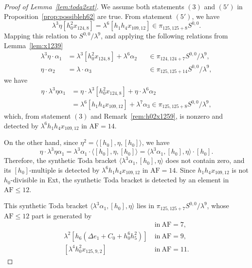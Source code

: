 \documentclass{amsart}
\numberwithin{equation}{section}
\newcommand{\AF}{\mathrm{AF}}
\begin{document}
\begin{proof}[Proof of Lemma~\ref{lem:toda2ext}]
    We assume both statements $(3)$ and $(5')$ in Proposition~\ref{prop:possibleh62} are true. From statement $(5')$, we have 
    $$\lambda^3 \eta [h_0^2x_{124,8}] = \lambda^6 [h_1h_4x_{109,12}] \in \pi_{125,125+8} S^{0,0}.$$
Mapping this relation to $S^{0,0}/\lambda^9$, and applying the following relations from Lemma~\ref{lem:x1239}
\begin{align*}
        \lambda^3 \eta \cdot \alpha_1 & = \lambda^3 [h_0^2 x_{124,8}] + 
\lambda^6 \alpha_2 && \in \pi_{124,124+7} S^{0,0}/\lambda^9,\\
\eta \cdot \alpha_2 & = \lambda \cdot \alpha_3 && \in \pi_{125,125+14} S^{0,0}/\lambda^9,
    \end{align*}
we have
\begin{align*}
    \eta \cdot \lambda^3 \eta \alpha_1 & = \eta \cdot \lambda^3 [h_0^2 x_{124,8}] + \eta \cdot \lambda^6 \alpha_2\\
   & = \lambda^6 [h_1h_4x_{109,12}] + \lambda^7 \alpha_3 \in \pi_{125,125+8} S^{0,0}/\lambda^9,
 \end{align*}
 which, from statement $(3)$ and Remark~\ref{rem:h02x1259}, is nonzero and detected by $\lambda^6 h_1h_4x_{109,12}$ in $\AF=14$.
 
 On the other hand, since $\eta^2 = \langle [h_0], \eta, [h_0] \rangle$, we have
 $$\eta \cdot \lambda^3 \eta \alpha_1 = \lambda^3 \alpha_1 \cdot \langle [h_0], \eta, [h_0] \rangle = \langle \lambda^3 \alpha_1, [h_0], \eta \rangle \cdot [h_0].$$
 Therefore, the synthetic Toda bracket
$\langle \lambda^3 \alpha_1, [h_0], \eta \rangle$
    does not contain zero, and its $[h_0]$-multiple is detected by $\lambda^6 h_1h_4x_{109,12}$ in $\AF=14$. Since $h_1h_4x_{109,12}$ is not $h_0$-divisible in Ext, the synthetic Toda bracket is detected by an element in $\AF \le 12$.
    

This synthetic Toda bracket $\langle \lambda^3 \alpha_1, [h_0], \eta \rangle$ lies in $\pi_{125,125+7} S^{0,0}/\lambda^9$, whose $\AF \le 12$ part is generated by
\begin{align*}
[h_0^2 x_{125,5}] \ & \text{in} \ \AF=7,\\ 
\lambda^2 [h_6(\Delta e_1 +C_0+h_0^6h_5^2)] \ & \text{in} \ \AF=9,\\ 
[\lambda^4 h_0^2 x_{125,9,2}] \ & \text{in} \ \AF=11.
\end{align*}




\end{proof}
\end{document}

